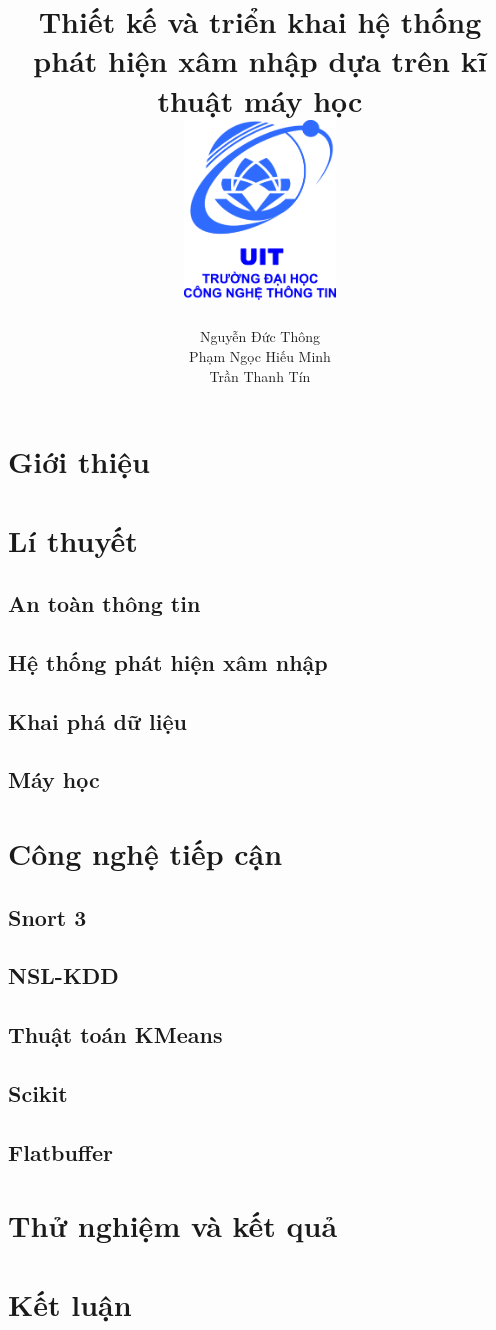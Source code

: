 \documentclass[12pt,twoside]{report}
\title{
    {Thiết kế và triển khai hệ thống phát hiện xâm nhập dựa trên kĩ thuật máy học}\\
    {\includegraphics[width=4cm]{logo}}
}
\author{
    Nguyễn Đức Thông
    \\
    Phạm Ngọc Hiếu Minh
    \\
    Trần Thanh Tín
}
\begin{document}
\maketitle
\newpage
\tableofcontents
\listoffigures
\newpage

    \chapter{Giới thiệu}
    
    \newpage
    \chapter{Lí thuyết}
    \section{An toàn thông tin}
    
    \section{Hệ thống phát hiện xâm nhập}
    
    \section{Khai phá dữ liệu}
    
    \section{Máy học}
    
    \newpage
    \chapter{Công nghệ tiếp cận}
    \section{Snort 3}
    
    \section{NSL-KDD}
    
    \section{Thuật toán KMeans}
    
    \section{Scikit}
    
    \section{Flatbuffer}
    
    \newpage
    \chapter{Thử nghiệm và kết quả}
    
    \newpage
    \chapter{Kết luận}
    

\newpage


\end{document}
